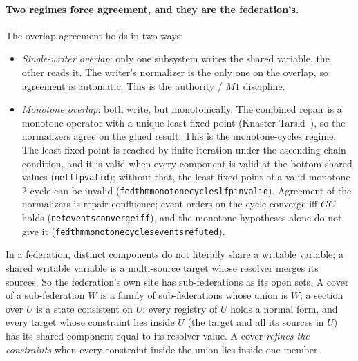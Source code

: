 \documentclass[11pt,a4paper]{article}
\theoremstyle{plain}
\theoremstyle{definition}
\theoremstyle{remark}
\renewcommand{\_}{\origunderscore\allowbreak}
\begin{document}
\paragraph{Two regimes force agreement, and they are the federation's.} The overlap agreement holds
in two ways:
\begin{itemize}[leftmargin=*]
\item \emph{Single-writer overlap}: only one subsystem writes the shared variable, the other reads
  it. The writer's normalizer is the only one on the overlap, so agreement is automatic. This is the
  authority / $M1$ discipline.
\item \emph{Monotone overlap}: both write, but monotonically. The combined repair is a monotone
  operator with a unique least fixed point (Knaster-Tarski~\cite{tarski1955}), so the normalizers
  agree on the glued result. This is the monotone-cycles regime. The least fixed point is reached by
  finite iteration under the ascending chain condition, and it is valid when every component is
  valid at the bottom shared values (\texttt{net\_lfp\_valid}); without that, the least fixed point
  of a valid monotone 2-cycle can be invalid (\texttt{fed\_thm\_monotone\_cycles\_lfp\_invalid}).
  Agreement of the normalizers is repair confluence; event orders on the cycle converge iff $GC$
  holds (\texttt{net\_events\_converge\_iff}), and the monotone hypotheses alone do not give it
  (\texttt{fed\_thm\_monotone\_cycles\_events\_refuted}).
\end{itemize}

In a federation, distinct components do not literally share a writable variable; a shared writable
variable is a multi-source target whose resolver merges its sources. So the federation's own site has
sub-federations as its open sets. A cover of a sub-federation $W$ is a family of sub-federations
whose union is $W$; a section over $U$ is a state consistent on $U$: every registry of $U$ holds a
normal form, and every target whose constraint lies inside $U$ (the target and all its sources in
$U$) has its shared component equal to its resolver value. A cover \emph{refines the constraints}
when every constraint inside the union lies inside one member.
\end{document}
